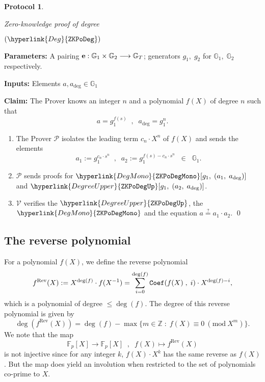 \documentclass[11pt, lettersize, notitlepage, leqno, footskip=0.6cm]{article}
\newcommand{\bz}{\mathbb Z}
\newcommand{\bFp}{\mathbb{F}_p}
\newcommand{\lra}{\longrightarrow}
\newcommand{\mc}{\mathcal}
\newcommand{\mb}{\mathbb}
\newcommand{\mr}{\mathrm}
\newcommand{\mP}{\mc{P}}
\newcommand{\V}{\mc{V}}
\newcommand{\vs}{\vspace{-0.15cm}}
\newcommand{\sta}{\stackrel{?}{=}}
\newcommand{\Mod}[1]{\ (\mathrm{mod}\ #1)}
\newtheorem{Prot}[Thm]{Protocol}
\numberwithin{equation}{section}
\begin{document}
\begin{mdframed}
\begin{Prot} \hypertarget{Deg}{Zero-knowledge proof of degree} $(\hyperlink{Deg}{\tt{ZKPoDeg}})$\end{Prot}  

\noindent \textbf{Parameters:} A pairing ${\bf{e}}:\mb{G}_1\times \mb{G}_2\lra \mb{G}_T$; generators $g_1,\;g_2$ for $\mb{G}_1,\; \mb{G}_2$ respectively.


\noindent \textbf{Inputs:} Elements $a, a_{\deg}\in \mb{G}_1$

\noindent \textbf{Claim:} The Prover knows an integer $n$ and a polynomial $f(X)$ of degree $n$ such that \vs $$a = g_1^{f(s)}\;\;,\;\;a_{\deg} = g_1^n.$$ 

\begin{enumerate}[wide, labelwidth=!, labelindent=0pt, itemsep=-0.2ex]


\item The Prover $\mP$ isolates the leading term $c_n\cdot X^n$ of $f(X)$ and sends the elements \vs $$a_{1}:= g_1^{c_n\cdot s^n}\;\;,\;\; a_{2}:= g_1^{f(s) - c_n\cdot  s^n}\;\;\in\;\;\mb{G}_1.$$

\item $\mP$ sends proofs for $\hyperlink{DegMono}{\tt{ZKPoDegMono}}[g_1,\;(a_{1},\; a_{\deg})]$ and $\hyperlink{DegreeUpper}{\tt{ZKPoDegUp}}[g_1,\;(a_{2},\; a_{\deg})]$.

\item $\V$ verifies the $\hyperlink{DegreeUpper}{\tt{ZKPoDegUp}}$, the $\hyperlink{DegMono}{\tt{ZKPoDegMono}}$ and the equation $a \sta a_{1}\cdot a_{2} $. \qed \end{enumerate}
\end{mdframed}


\bigskip

\subsection{\fontsize{11}{11}\selectfont The reverse polynomial}

For a polynomial $f(X)$, we define the reverse polynomial \vs $$f^{\mr{Rev}}(X):= X^{\deg(f)}\cdot f(X^{-1}) = \sum\limits_{i=0}^{\deg(f)} {\tt{Coef}}(f(X)\;,\;i)\cdot X^{\deg(f)-i}, $$  which is a polynomial of degree $\leq \deg(f)$. The degree of this reverse polynomial is given by $$ \deg(f^{\mr{Rev}}(X)) = \deg(f) - \max\{m\in \bz\; : \; f(X)\equiv 0\Mod{X^m}\}.   $$ We note that the map \vs $$ \bFp[X] \lra \bFp[X]\;\;,\;\;f(X)\mapsto f^{\mr{Rev}}(X) $$ is not injective since for any integer $k$, $f(X)\cdot X^k$ has the same reverse as $f(X)$. But the map does yield an involution when restricted to the set of polynomials co-prime to $X$. 
\end{document}
